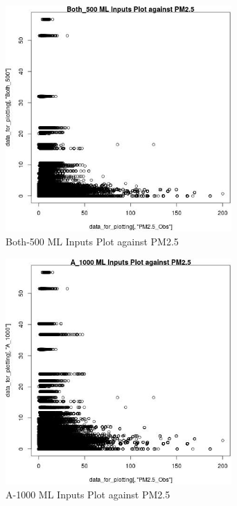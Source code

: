 \begin{figure} 
\centering  
\includegraphics[width=0.77\textwidth]{Code_Outputs/ML_input_report_ML_input_PM25_Step5_part_d_de_duplicated_aves_ML_input_Both_500vPM25_Obs.jpg} 
\caption{\label{fig:ML_input_report_ML_input_PM25_Step5_part_d_de_duplicated_aves_ML_inputBoth_500vPM25_Obs}Both-500 ML Inputs Plot against PM2.5} 
\end{figure} 
 

\begin{figure} 
\centering  
\includegraphics[width=0.77\textwidth]{Code_Outputs/ML_input_report_ML_input_PM25_Step5_part_d_de_duplicated_aves_ML_input_A_1000vPM25_Obs.jpg} 
\caption{\label{fig:ML_input_report_ML_input_PM25_Step5_part_d_de_duplicated_aves_ML_inputA_1000vPM25_Obs}A-1000 ML Inputs Plot against PM2.5} 
\end{figure} 
 

